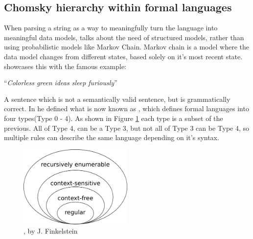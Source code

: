 \subsection{Chomsky hierarchy within formal languages}
When parsing a string as a way to meaningfully turn the language into meaningful data models, \citep{Chomsky} talks about the need of structured models, rather than using probabilistic models like Markov Chain. Markov chain is a model where the data model changes from different states, based solely on it's most recent state. \citep{Chomsky} showcases this with the famous example:

\vspace{12pt}
\centerline{``\emph{Colorless green ideas sleep furiously}''}
\vspace{12pt}

A sentence which is not a semantically valid sentence, but is grammatically correct. In \citep{Chomsky} he defined what is now known as \emph{\hierarchy{}}, which defines formal languages into four types(Type 0 - 4). As shown in Figure \ref{fig:Chomsky} each type is a subset of the previous. All of Type 4, can be a Type 3, but not all of Type 3 can be Type 4, so multiple rules can describe the same language depending on it's syntax.
\begin{figure}[ht!]
    \centerline{\includegraphics[width=0.5\textwidth]{img/Chomsky.png}}
    \caption{\hierarchy{}, by J. Finkelstein}
    \label{fig:Chomsky}
\end{figure}
\newpage
